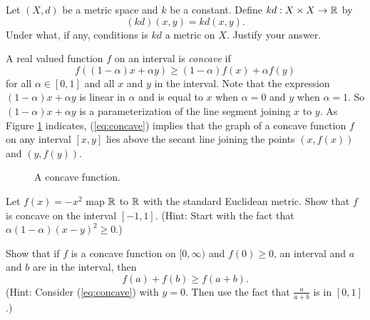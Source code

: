{\begin{comment}
Note that $d(x,y) < 1$ for all $x,y \in \R$. This is an example of a \emph{bounded} metric. 

\begin{definition} A metric $d$ on a set $X$ is \textbf{bounded} if there is a constant $K$ such that $d(x,y) \leq K$ for all $x, y \in X$.
\end{definition} 
 
\end{comment}

\item Let $(X,d)$ be a metric space and $k$ be a constant. Define $kd: X \times X \to \mathbb{R}$ by 
\[(kd)(x,y) = kd(x,y).\]
Under what, if any, conditions is $kd$ a metric on $X$. Justify your answer. 


\item A real valued function $f$ on an interval is \emph{concave} if 
\begin{equation} \label{eq:concave}
f((1-\alpha)x + \alpha y) \geq (1-\alpha)f(x) + \alpha f(y)
\end{equation}
for all $\alpha \in [0,1]$ and all $x$ and $y$ in the interval. Note that the expression $(1-\alpha)x + \alpha y$ is linear in $\alpha$ and is equal to $x$ when $\alpha = 0$ and $y$ when $\alpha = 1$. So $(1-\alpha)x + \alpha y$ is a parameterization of the line segment joining $x$ to $y$. As Figure \ref{F:concave} indicates, (\ref{eq:concave}) implies that the graph of a concave function $f$ on any interval $[x,y]$ lies above the secant line joining the points $(x,f(x))$ and $(y,f(y))$. 
\begin{figure}[ht]
\begin{center}
\caption{A concave function.}
\label{F:concave}
\end{center}
\end{figure}

\ba

\item Let $f(x) = -x^2$ map $\mathbb{R}$ to $\mathbb{R}$ with the standard Euclidean metric. Show that $f$ is concave on the interval $[-1,1]$.  (Hint: Start with the fact that $\alpha(1-\alpha)(x-y)^2 \geq 0$.)

\item Show that if $f$ is a concave function on $[0,\infty)$ and $f(0) \geq 0$, an interval and $a$ and $b$ are in the interval, then 
\[f(a) + f(b) \geq f(a+b).\]
(Hint: Consider (\ref{eq:concave}) with $y=0$. Then use the fact that $\frac{a}{a+b}$ is in $[0,1]$.)

}
